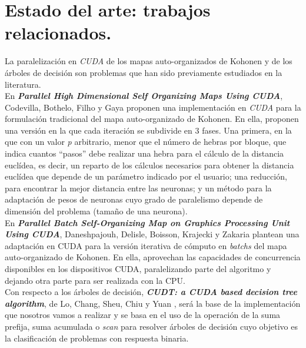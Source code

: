 \documentclass[a4paper,oneside,11pt,titlepage]{book}
\begin{document}
%


\chapter{Estado del arte: trabajos relacionados.}
La paralelización en \textit{CUDA} de los mapas auto-organizados de Kohonen y de los árboles de decisión son problemas que han sido previamente estudiados en la literatura.\\

En \textbf{\textit{Parallel High Dimensional Self Organizing Maps Using CUDA}}, Codevilla, Bothelo, Filho y Gaya \cite{cudasomonline} proponen una implementación en \textit{CUDA} para la formulación tradicional del mapa auto-organizado de Kohonen. En ella, proponen una versión en la que cada iteración se subdivide en 3 fases. Una primera, en la que con un valor \textit{p} arbitrario, menor que el número de hebras por bloque, que indica cuantos ``pasos'' debe realizar una hebra para el cálculo de la distancia euclídea, es decir, un reparto de los cálculos necesarios para obtener la distancia euclídea que depende de un parámetro indicado por el usuario; una reducción, para encontrar la mejor distancia entre las neuronas; y un método para la adaptación de pesos de neuronas cuyo grado de paralelismo depende de dimensión del problema (tamaño de una neurona). \\

En \textbf{\textit{Parallel Batch Self-Organizing Map on Graphics Processing Unit Using CUDA}}, Daneshpajouh, Delisle, Boisson, Krajecki y Zakaria \cite{cudasombatch} plantean una adaptación en CUDA para la versión iterativa de cómputo en \textit{batchs} del mapa auto-organizado de Kohonen. En ella, aprovechan las capacidades de concurrencia disponibles en los dispositivos CUDA, paralelizando parte del algoritmo y dejando otra parte para ser realizada con la CPU.\\

Con respecto a los árboles de decisión, \textbf{\textit{CUDT: a CUDA based decision tree algorithm}}, de Lo, Chang, Sheu, Chiu y Yuan \cite{cudt}, será la base de la implementación que nosotros vamos a realizar y se basa en el uso de la operación de la suma prefija, suma acumulada o \textit{scan} para resolver árboles de decisión cuyo objetivo es la clasificación de problemas con respuesta binaria.\\
\end{document}
